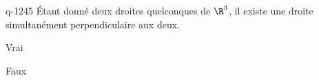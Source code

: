 \begin{truefalse}{q-1245}
Étant donné deux droites quelconques de $\R^3$, il existe une droite simultanément perpendiculaire aux deux.
\item* Vrai
\item Faux
\end{truefalse}

